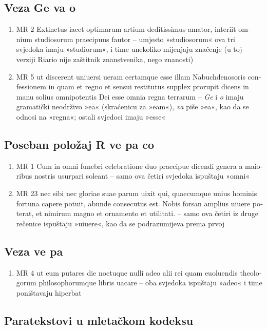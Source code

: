 \documentclass[a5paper,twoside]{article}
\begin{document}
\subsection{Veza Ge va o}
\begin{enumerate}[label=\alph*)]
\item MR 2 \textlatin{Extinctus iacet optimarum artium deditissimus amator, interiit omnium studiosorum praecipuus fautor} – umjesto »studiosorum« ova tri svjedoka imaju »studiorum«, i time unekoliko mijenjaju značenje (u toj verziji Riario nije zaštitnik znanstvenika, nego znanosti)
\item MR 5 \textlatin{ut discerent uniuersi ueram certamque esse illam Nabuchdenosoris confessionem in quam et regno et sensui restitutus supplex prorupit dicens in manu solius omnipotentis Dei esse omnia regna terrarum} – \textit{Ge} i \textit{o} imaju gramatički neodrživo »eā« (skraćenicu za »eam«), \textit{va} piše »ea«, kao da se odnosi na »regna«; ostali svjedoci imaju »esse«
\end{enumerate}
\subsection{Poseban položaj R ve pa co}
\begin{enumerate}[label=\alph*)]
\item MR 1 \textlatin{Cum in omni funebri celebratione duo praecipue dicendi genera a maioribus nostris usurpari soleant} – samo ova četiri svjedoka ispuštaju »omni«
\item MR 23 \textlatin{nec sibi nec gloriae suae parum uixit qui, quaecumque unius hominis fortuna capere potuit, abunde consecutus est. Nobis forsan amplius uiuere poterat, et nimirum magno et ornamento et utilitati.} – samo ova četiri iz druge rečenice ispuštaju »uiuere«, kao da se podrazumijeva prema prvoj
\end{enumerate}
\subsection{Veza ve pa}
\begin{enumerate}[label=\alph*)]
\item MR 4 \textlatin{ut eum putares die noctuque nulli adeo alii rei quam euoluendis theologorum philosophorumque libris uacare} – oba svjedoka ispuštaju »adeo« i time poništavaju hiperbat
\end{enumerate}

\subsection{Paratekstovi u mletačkom kodeksu}
\end{document}
